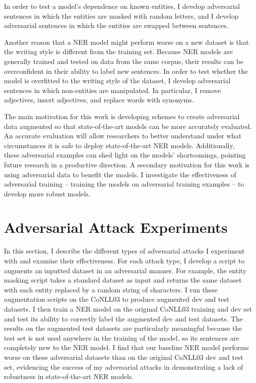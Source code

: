 In order to test a model's dependence on known entities, I develop adversarial sentences in which the entities are masked with random letters, and I develop adversarial sentences in which the entities are swapped between sentences.

Another reason that a NER model might perform worse on a new dataset is that the writing style is different  from the training set. Because NER models are generally trained and tested on data from the same corpus, their results can be overconfident in their ability to label new sentences. In order to test whether the model is overfitted to the writing style of the dataset, I develop adversarial sentences in which non-entities are manipulated. In particular, I remove adjectives, insert adjectives, and replace words with synonyms.

The main motivation for this work is developing schemes to create adversarial data augmented so that state-of-the-art models can be more accurately evaluated. An accurate evaluation will allow researchers to better understand under what circumstances it is safe to deploy state-of-the-art NER models. Additionally, these adversarial examples can shed light on the models' shortcomings, pointing future research in a productive direction. A secondary motivation for this work is using adversarial data to benefit the models. I investigate the effectiveness of adversarial training -- training the models on adversarial training examples -- to develop more robust models.


\section{Adversarial Attack Experiments}
In this section, I describe the different types of adversarial attacks I experiment with and examine their effectiveness. For each attack type, I develop a script to augments an inputted dataset in an adversarial manner. For example, the entity masking script takes a standard dataset as input and returns the same dataset with each entity replaced by a random string of characters. I run these augmentation scripts on the CoNLL03 to produce augmented dev and test datasets. I then train a NER model on the original CoNLL03 training and dev set and test its ability to correctly label the augmented dev and test datasets. The results on the augmented test datasets are particularly meaningful because the test set is not used anywhere in the training of the model, so its sentences are completely new to the NER model. I find that our baseline NER model performs worse on these adversarial datasets than on the original CoNLL03 dev and test set, evidencing the success of my adversarial attacks in demonstrating a lack of robustness in state-of-the-art NER models.

